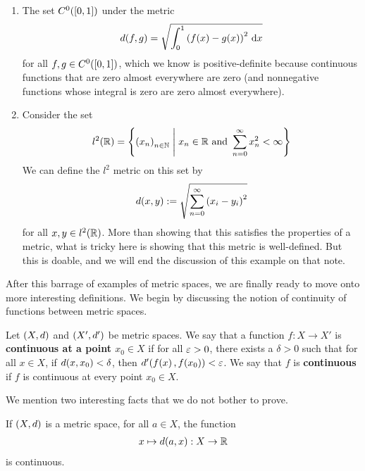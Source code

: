 \begin{boxexample}
\begin{enumerate}
        \item The set $C^0\!\left( \left[ 0, 1 \right] \right)$ under the metric
        \begin{align*}
            d(f, g) = \sqrt{\int_{0}^{1} \left( f(x) - g(x) \right)^2 \, \operatorname{d}\!x}
        \end{align*}
        for all $f, g \in C^0\!\left( \left[ 0, 1 \right] \right)$, which we know is positive-definite because continuous functions that are zero almost everywhere are zero (and nonnegative functions whose integral is zero are zero almost everywhere).

        \item Consider the set
        \begin{align*}
            l^2\!\left( \mathbb{R} \right) = \left\{ \left( x_n \right)_{n \in \mathbb{N}} \; \middle\vert \; x_n \in \mathbb{R} \text{ and } \sum_{n=0}^{\infty} x_n^2 < \infty \right\}
        \end{align*}
        We can define the $l^2$ metric on this set by
        \begin{align*}
            d(x, y) := \sqrt{\sum_{n=0}^{\infty} \left( x_i - y_i \right)^2}
        \end{align*}
        for all $x, y \in l^2\!\left( \mathbb{R} \right)$. More than showing that this satisfies the properties of a metric, what is tricky here is showing that this metric is well-defined. But this is doable, and we will end the discussion of this example on that note.
    \end{enumerate}
\end{boxexample}

After this barrage of examples of metric spaces, we are finally ready to move onto more interesting definitions. We begin by discussing the notion of continuity of functions between metric spaces.

\begin{boxdefinition}[Continuity]\label{Ch1:Def:Continuity_Metric}
    Let $\left( X, d \right)$ and $\left( X', d' \right)$ be metric spaces. We say that a function $f : X \to X'$ is \textbf{continuous at a point $x_0 \in X$} if for all $\varepsilon > 0$, there exists a $\delta > 0$ such that for all $x \in X$, if $d\!\left( x, x_0 \right) < \delta$, then $d'\!\left( f\!\left( x \right), f\!\left( x_0 \right) \right) < \varepsilon$. We say that $f$ is \textbf{continuous} if $f$ is continuous at every point $x_0 \in X$.
\end{boxdefinition}

We mention two interesting facts that we do not bother to prove.

\begin{boxexercise}
    If $\left( X, d \right)$ is a metric space, for all $a \in X$, the function
    \begin{align*}
        x \mapsto d\!\left( a, x \right) : X \to \mathbb{R}
    \end{align*}
    is continuous.
\end{boxexercise}

